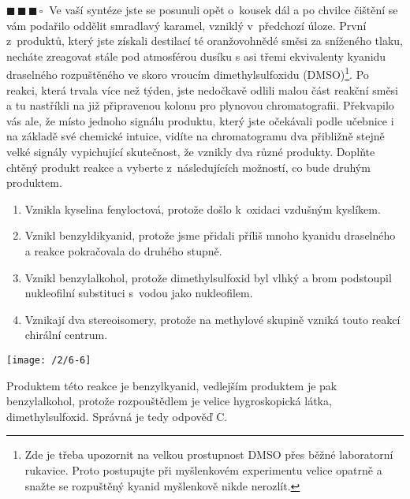 \documentclass{book}
\newcommand{\tri}{$\blacksquare \, \blacksquare \, \blacksquare \, \square \; \; $}
\renewenvironment{quotation}{\par}{\par} %
\begin{document}
\hrulefill %
\begin{quotation}
\tri Ve vaší syntéze jste se posunuli opět o~kousek dál a po chvilce
čištění se vám podařilo oddělit smradlavý karamel, vzniklý v~předchozí úloze. První z~produktů, který jste získali destilací té oranžovohnědé
směsi za sníženého tlaku, necháte zreagovat stále pod atmosférou dusíku
s asi třemi ekvivalenty kyanidu draselného rozpuštěného ve skoro vroucím dimethylsulfoxidu (DMSO)\footnote{Zde je třeba upozornit na velkou prostupnost
DMSO přes běžné laboratorní rukavice. Proto postupujte při myšlenkovém
experimentu velice opatrně a snažte se rozpuštěný kyanid myšlenkově
nikde nerozlít.}. Po reakci, která trvala více než týden, jste nedočkavě
odlili malou část reakční směsi a tu nastříkli na již připravenou
kolonu pro plynovou chromatografii. Překvapilo vás ale, že místo jednoho
signálu produktu, který jste očekávali podle učebnice i na základě své
chemické intuice, vidíte na chromatogramu dva přibližně stejně velké
signály vypichující skutečnost, že vznikly dva různé produkty. Doplňte
chtěný produkt reakce a vyberte z~následujících možností, co bude druhým produktem.

\begin{enumerate}[label=\Alph*)]
\item Vznikla kyselina fenyloctová, protože došlo k~oxidaci vzdušným
kyslíkem. 
\item Vznikl benzyldikyanid, protože jsme přidali příliš mnoho kyanidu
draselného a reakce pokračovala do druhého stupně. 
\item Vznikl benzylalkohol, protože dimethylsulfoxid byl vlhký a
brom podstoupil nukleofilní substituci s~vodou jako nukleofilem. 
\item Vznikají dva stereoisomery, protože na methylové skupině vzniká
touto reakcí chirální centrum.
\end{enumerate}

\begin{center}
\texttt{[image: /2/6-6]}
\end{center}
\end{quotation} \dotfill \par 
Produktem této reakce je benzylkyanid, vedlejším produktem je pak
benzylalkohol, protože rozpouštědlem je velice hygroskopická látka,
dimethylsulfoxid. Správná je tedy odpověď C.
\end{document}
